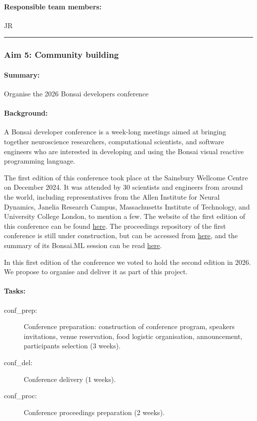\paragraph{Responsible team members:} JR

\noindent\rule{\textwidth}{1pt}
\subsubsection{Aim 5: Community building}
\paragraph{Summary:} Organise the 2026 Bonsai developers conference

\paragraph{Background:} A Bonsai developer conference is a week-long
meetings aimed at bringing together neuroscience researchers, computational
scientists, and software engineers who are interested in developing and using
the Bonsai visual reactive programming language.

The first edition of this conference took place at the Sainsbury Wellcome
Centre on December 2024. It was attended by 30 scientists and engineers from
around the world, including representatives from the Allen Institute for Neural
Dynamics, Janelia Research Campus, Massachusetts Institute of Technology, and
University College London, to mention a few.
%
The website of the first edition of this conference  can be found
\href{https://conference.bonsai-rx.org/2024/}{here}.  The proceedings
repository of the first conference is still under construction, but can be
accessed from
\href{https://github.com/joacorapela/bonsaiConference2024Proceedings}{here},
and the summary of its Bonsai.ML session can be read
\href{https://github.com/joacorapela/bonsaiConference2024Proceedings/blob/master/sessions/machineLearning/README.md}{here}.

In this first edition of the conference we voted to hold the second edition in
2026. We propose to organise and deliver it as part of this project.

\paragraph{Tasks:}

\begin{description}

    \item[conf\_prep:] Conference preparation: construction of conference
        program, speakers invitations, venue reservation, food logistic
        organisation, announcement, participants selection (3 weeks).
    \item[conf\_del:] Conference delivery (1 weeks).
    \item[conf\_proc:] Conference proceedings preparation (2 weeks).

\end{description}

